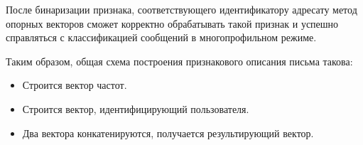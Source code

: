 После бинаризации признака, соответствующего идентификатору адресату метод опорных векторов сможет корректно обрабатывать такой признак и успешно справляться с классификацией сообщений в многопрофильном режиме.

Таким образом, общая схема построения признакового описания письма такова:

\begin{itemize}
	\item Строится вектор частот.
	\item Строится вектор, идентифицирующий пользователя.
	\item Два вектора конкатенируются, получается результирующий вектор.
\end{itemize}


